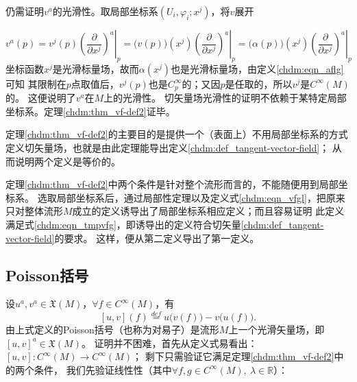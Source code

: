 仍需证明$v^a$的光滑性。取局部坐标系$(U_i,\varphi_i;x^j)$，将$v$展开

\begin{equation}\label{chdm:eqn_tmpadf23}
    v^a(p) = v^j(p) \left.\left(\frac{\partial }{\partial x^j}\right)^a \right|_p
      = \bigl(v(p)\bigr)(x^j) \left.\left(\frac{\partial }{\partial x^j}\right)^a \right|_p
      = \bigl(\alpha(p)\bigr)(x^j) \left.\left(\frac{\partial }{\partial x^j}\right)^a \right|_p
\end{equation}
坐标函数$x^j$是光滑标量场，故而$\alpha(x^j)$也是光滑标量场，由定义\eqref{chdm:eqn_aflg}可知
其限制在$p$点取值后，$v^j(p)$也是$C^\infty_p$的；又因$p$是任取的，所以$v^j$是$C^\infty(M)$的。
这便说明了$v^a$在$M$上的光滑性。
切矢量场光滑性的证明不依赖于某特定局部坐标系。定理\ref{chdm:thm_vf-def2}证毕。

\begin{remark}
    定理\ref{chdm:thm_vf-def2}的主要目的是提供一个（表面上）不用局部坐标系的方式
    定义切矢量场，也就是由此定理能导出定义\ref{chdm:def_tangent-vector-field}；
    从而说明两个定义是等价的。

    定理\ref{chdm:thm_vf-def2}中两个条件是针对整个流形而言的，不能随便用到局部坐标系。
    选取局部坐标系后，通过局部性定理以及定义式\eqref{chdm:eqn_vfgl}，把原来
    只对整体流形$M$成立的定义诱导出了局部坐标系相应定义；而且容易证明
    此定义满足式\eqref{chdm:eqn_tmpvfg}，即诱导出的定义符合切矢量\ref{chdm:def_tangent-vector-field}的要求。
    这样，便从第二定义导出了第一定义。
\end{remark}



\subsection{Poisson括号}\label{chdm:sec_poisson-lie}
设$u^a,v^a \in \mathfrak{X}(M)$，$\forall f\in C^\infty(M)$，有
\begin{equation}\label{chdm:def_poisson-bracket}
    \left[u,v\right] (f) \overset{def}{=} u\bigl(v(f)\bigr) - v\bigl(u(f)\bigr) .
\end{equation}
由上式定义的Poisson括号（也称为对易子）是流形$M$上一个光滑矢量场，即$[u,v]^a \in \mathfrak{X}(M)$。
证明并不困难，首先从定义式易看出：$\left[u,v\right]:C^\infty(M)\to C^\infty(M)$；
剩下只需验证它满足定理\ref{chdm:thm_vf-def2}中的两个条件，
我们先验证线性性（其中$\forall f,g \in C^\infty(M),\ \lambda \in \mathbb{R} $）：

